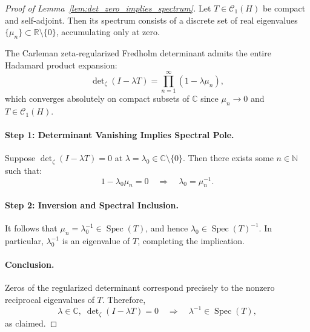 \begin{proof}[Proof of Lemma~\ref{lem:det_zero_implies_spectrum}]
Let \( T \in \mathcal{C}_1(H) \) be compact and self-adjoint. Then its spectrum consists of a discrete set of real eigenvalues \( \{ \mu_n \} \subset \mathbb{R} \setminus \{0\} \), accumulating only at zero.

The Carleman zeta-regularized Fredholm determinant admits the entire Hadamard product expansion:
\[
\det\nolimits_{\zeta}(I - \lambda T) = \prod_{n=1}^\infty (1 - \lambda \mu_n),
\]
which converges absolutely on compact subsets of \( \mathbb{C} \) since \( \mu_n \to 0 \) and \( T \in \mathcal{C}_1(H) \).

\paragraph{Step 1: Determinant Vanishing Implies Spectral Pole.}
Suppose \( \det\nolimits_{\zeta}(I - \lambda T) = 0 \) at \( \lambda = \lambda_0 \in \mathbb{C} \setminus \{0\} \). Then there exists some \( n \in \mathbb{N} \) such that:
\[
1 - \lambda_0 \mu_n = 0 \quad \Longrightarrow \quad \lambda_0 = \mu_n^{-1}.
\]

\paragraph{Step 2: Inversion and Spectral Inclusion.}
It follows that \( \mu_n = \lambda_0^{-1} \in \operatorname{Spec}(T) \), and hence \( \lambda_0 \in \operatorname{Spec}(T)^{-1} \). In particular, \( \lambda_0^{-1} \) is an eigenvalue of \( T \), completing the implication.

\paragraph{Conclusion.}
Zeros of the regularized determinant correspond precisely to the nonzero reciprocal eigenvalues of \( T \). Therefore,
\[
\lambda \in \mathbb{C}, \; \det\nolimits_{\zeta}(I - \lambda T) = 0 \quad \Longrightarrow \quad \lambda^{-1} \in \operatorname{Spec}(T),
\]
as claimed.
\end{proof}
